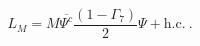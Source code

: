 \begin{equation}
L_M=M \overline{\Psi^c}\frac{(1-\Gamma_7)}{2}\Psi + \mbox{h.c.}~.
\label{maj}
\end{equation}

